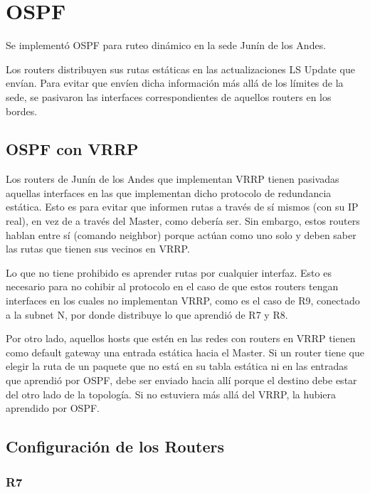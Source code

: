 \section{OSPF}
Se implementó OSPF para ruteo dinámico en la sede Junín de los Andes.

Los routers distribuyen sus rutas estáticas en las actualizaciones LS Update que envían. Para evitar que envíen dicha información más allá de los límites de la sede, se pasivaron las interfaces correspondientes de aquellos routers en los bordes.

\subsection{OSPF con VRRP}
Los routers de Junín de los Andes que implementan VRRP tienen pasivadas aquellas interfaces en las que implementan dicho protocolo de redundancia estática. Esto es para evitar que informen rutas a través de sí mismos (con su IP real), en vez de a través del Master, como debería ser. Sin embargo, estos routers hablan entre sí (comando neighbor) porque actúan como uno solo y deben saber las rutas que tienen sus vecinos en VRRP.

Lo que no tiene prohibido es aprender rutas por cualquier interfaz. Esto es necesario para no cohibir al protocolo en el caso de que estos routers tengan interfaces en los cuales no implementan VRRP, como es el caso de R9, conectado a la subnet N, por donde distribuye lo que aprendió de R7 y R8.

Por otro lado, aquellos hosts que estén en las redes con routers en VRRP tienen como default gateway una entrada estática hacia el Master. 
Si un router tiene que elegir la ruta de un paquete que no está en su tabla estática ni en las entradas que aprendió por OSPF, debe ser enviado hacia allí porque el destino debe estar del otro lado de la topología. Si no estuviera más allá del VRRP, la hubiera aprendido por OSPF.

\subsection{Configuración de los Routers}
\subsubsection{R7}
{\small
\begin{verbatim}

\end{verbatim}
}

